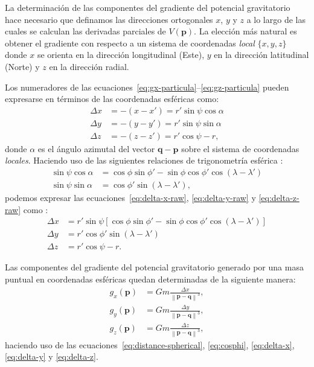 La determinación de las componentes del gradiente del potencial gravitatorio
hace necesario que definamos las direcciones ortogonales $x$, $y$ y $z$ a lo
largo de las cuales se calculan las derivadas parciales de $V(\mathbf{p})$.
La elección más natural es obtener el gradiente con respecto a un sistema de
coordenadas \emph{local} $\{x, y, z\}$ \citep{grombein2013,uieda2016} donde $x$
se orienta en la dirección longitudinal (Este), $y$ en la dirección latitudinal
(Norte) y $z$ en la dirección radial.

Los numeradores de las ecuaciones~\ref{eq:gx-particula}--\ref{eq:gz-particula}
pueden expresarse en términos de las coordenadas esféricas como:
%
\begin{align}
    \Delta x &= - (x - x') = r' \sin\psi \cos\alpha
    \label{eq:delta-x-raw}
    \\
    \Delta y &= - (y - y') = r' \sin\psi \sin\alpha
    \label{eq:delta-y-raw}
    \\
    \Delta z &= - (z - z') = r'\cos\psi - r,
    \label{eq:delta-z-raw}
\end{align}
%
donde $\alpha$ es el ángulo azimutal del vector
$\mathbf{q} - \mathbf{p}$ sobre el sistema de coordenadas \emph{locales}.
Haciendo uso de las siguientes relaciones de trigonometría esférica
\citep[][p.~113]{heiskanen1967}:
%
\begin{align}
    \sin\psi \cos\alpha &=
        \cos\phi \sin\phi' - \sin\phi \cos\phi' \cos(\lambda - \lambda') \\
    \sin\psi \sin\alpha &=
        \cos\phi' \sin(\lambda - \lambda'),
\end{align}
%
podemos expresar las ecuaciones~\ref{eq:delta-x-raw},
\ref{eq:delta-y-raw} y \ref{eq:delta-z-raw} como \citep{grombein2013}:
%
\begin{align}
    \Delta x &= r' \sin\psi \left[
        \cos\phi \sin\phi' - \sin\phi \cos\phi' \cos(\lambda - \lambda')
        \right]
    \label{eq:delta-x}
    \\
    \Delta y &= r' \cos\phi' \sin(\lambda - \lambda')
    \label{eq:delta-y}
    \\
    \Delta z &= r'\cos\psi - r.
    \label{eq:delta-z}
\end{align}

Las componentes del gradiente del potencial gravitatorio generado por una masa
puntual en coordenadas esféricas quedan determinadas de la siguiente manera:
%
\begin{align}
    g_x(\mathbf{p}) &=
        G m
        \frac{\Delta x}{\left\lVert \mathbf{p} - \mathbf{q} \right\rVert^3},
    \label{eq:gx-particula-spherical}
    \\
    g_y(\mathbf{p}) &=
        G m
        \frac{\Delta y}{\left\lVert \mathbf{p} - \mathbf{q} \right\rVert^3},
    \label{eq:gy-particula-spherical}
    \\
    g_z(\mathbf{p}) &=
        G m
        \frac{\Delta z}{\left\lVert \mathbf{p} - \mathbf{q} \right\rVert^3},
    \label{eq:gz-particula-spherical}
\end{align}
%
haciendo uso de las ecuaciones~\ref{eq:distance-spherical},
\ref{eq:cosphi}, \ref{eq:delta-x}, \ref{eq:delta-y} y \ref{eq:delta-z}.


